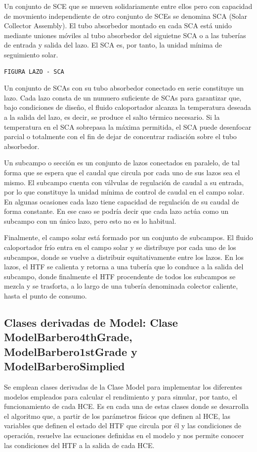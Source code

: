 Un conjunto de SCE que se mueven solidariamente entre ellos pero con capacidad de movmiento independiente de otro conjunto de SCEs se denomina SCA (Solar Collector Assembly). El tubo absorbedor montado en cada SCA está unido mediante uniones móviles al tubo absorbedor del siguietne SCA o a las tuberías de entrada y salida del lazo. El SCA es, por tanto, la unidad mínima de seguimiento solar.

\begin{verbatim}
FIGURA LAZO - SCA
\end{verbatim}

Un conjunto de SCAs con su tubo absorbedor conectado en serie constituye un lazo. Cada lazo consta de un numuero suficiente de SCAs para garantizar que, bajo condiciones de diseño, el fluido caloportador alcanza la temperatura deseada a la salida del lazo, es decir, se produce el salto térmico necesario. Si la temperatura en el SCA sobrepasa la máxima permitida, el SCA puede desenfocar parcial o totalmente con el fin de dejar de concentrar radiación sobre el tubo absorbedor.

Un subcampo o sección es un conjunto de lazos conectados en paralelo, de tal forma que se espera que el caudal que circula por cada uno de sus lazos sea el mismo. El subcampo cuenta con válvulas de regulación de caudal a su entrada, por lo que constituye la unidad mínima de control de caudal en el campo solar. En algunas ocasiones cada lazo tiene capacidad de regulación de su caudal de forma constante. En ese caso se podría decir que cada lazo actúa como un subcampo con un único lazo, pero esto no es lo habitual.

Finalmente, el campo solar está formado por un conjunto de subcampos. El fluido caloportador frío entra en el campo solar y se distribuye por cada uno de los subcampos, donde se vuelve a distribuir equitativamente entre los lazos. En los lazos, el HTF se calienta y retorna a una tubería que lo conduce a la salida del subcampo, donde finalmente el HTF procendente de todos los subcampos se mezcla y se trasforta, a lo largo de una tubería denominada colector caliente, hasta el punto de consumo.

\subsection{Clases derivadas de Model: Clase ModelBarbero4thGrade, ModelBarbero1stGrade y ModelBarberoSimplied}

Se emplean clases derivadas de la Clase Model para implementar los diferentes modelos empleados para calcular el rendimiento y para simular, por tanto, el funcionamiento de cada HCE. Es en cada una de estas clases donde se desarrolla el algoritmo que, a partir de los parámetros físicos que definen al HCE, las variables que definen el estado del HTF que circula por él y las condiciones de operación, resuelve las ecuaciones definidas en el modelo y nos permite conocer las condiciones del HTF a la salida de cada HCE.

